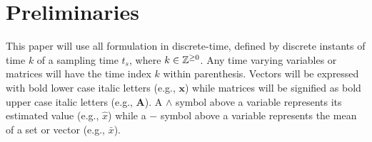 
\section{Preliminaries} \label{sec:preliminaries}

This paper will use all formulation in discrete-time, defined by discrete instants of time $k$ of a sampling time $t_s$, where $k \in \mathbb{Z}^{\geq0}$. Any time varying variables or matrices will have the time index $k$ within parenthesis. Vectors will be expressed with bold lower case italic letters (e.g., $\bm{x}$) while matrices will be signified as bold upper case italic letters (e.g., $\bm{A}$). A $\wedge$ symbol above a variable represents its estimated value (e.g., $\hat{x}$) while a $-$ symbol above a variable represents the mean of a set or vector (e.g., $\bar{x}$).


